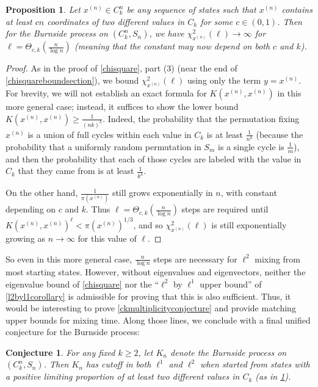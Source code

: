 \documentclass[11pt]{article}
\newcounter{r}
\newcounter{s}
\numberwithin{equation}{section}
\newtheorem{conjecture}[theorem]{Conjecture}
\newtheorem{proposition}[theorem]{Proposition}
\begin{document}
\begin{proposition}\label{slowmixingwithinorbits}
Let $x^{(n)} \in C_k^n$ be any sequence of states such that $x^{(n)}$ contains at least $cn$ coordinates of two different values in $C_k$ for some $c \in (0, 1)$. Then for the Burnside process on $(C_k^n, S_n)$, we have $\chi_{x^{(n)}}^2(\ell) \to \infty$ for $\ell = \Theta_{c,k}(\frac{n}{\log n})$ (meaning that the constant may now depend on both $c$ and $k$).
\end{proposition}
\begin{proof}
As in the proof of \cref{chisquare}, part (3) (near the end of \cref{chisquareboundsection}), we bound $\chi_{x^{(n)}}^2(\ell)$ using only the term $y = x^{(n)}$. For brevity, we will not establish an exact formula for $K(x^{(n)}, x^{(n)})$ in this more general case; instead, it suffices to show the lower bound $K(x^{(n)}, x^{(n)}) \ge \frac{1}{(nk)^k}$. Indeed, the probability that the permutation fixing $x^{(n)}$ is a union of full cycles within each value in $C_k$ is at least $\frac{1}{n^k}$ (because the probability that a uniformly random permutation in $S_m$ is a single cycle is $\frac{1}{m}$), and then the probability that each of those cycles are labeled with the value in $C_k$ that they came from is at least $\frac{1}{k^k}$. 

On the other hand, $\frac{1}{\pi(x^{(n)})}$ still grows exponentially in $n$, with constant depending on $c$ and $k$. Thus $\ell = \Theta_{c,k}\left(\frac{n}{\log n}\right)$ steps are required until $K\left(x^{(n)}, x^{(n)}\right)^\ell < \pi(x^{(n)})^{1/3}$, and so $\chi_{x^{(n)}}^2(\ell)$ is still exponentially growing as $n \to \infty$ for this value of $\ell$.
\end{proof}

So even in this more general case, $\frac{n}{\log n}$ steps are necessary for $\ell^2$ mixing from most starting states. However, without eigenvalues and eigenvectors, neither the eigenvalue bound of \cref{chisquare} nor the ``$\ell^2$ by $\ell^1$ upper bound'' of \cref{l2byl1corollary} is admissible for proving that this is also sufficient. Thus, it would be interesting to prove \cref{ckmultiplicityconjecture} and  provide matching upper bounds for mixing time. Along those lines, we conclude with a final unified conjecture for the Burnside process:

\begin{conjecture}
For any fixed $k \ge 2$, let $K_n$ denote the Burnside process on $(C_k^n, S_n)$. Then $K_n$ has cutoff in both $\ell^1$ and $\ell^2$ when started from states with a positive limiting proportion of at least two different values in $C_k$ (as in \cref{slowmixingwithinorbits}).
\end{conjecture}



\end{document}
